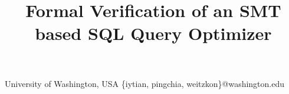 \documentclass[10pt,nonatbib,preprint]{sigplanconf}
\begin{document}
\title{Formal Verification of an SMT based SQL Query Optimizer}

           {University of Washington, USA}
           {\{iytian, pingchia, weitzkon\}@washington.edu\vspace{-1em}}
\maketitle





% 
% 
% 
% 
% 
% 
% 
% 
% 
% 
% 

\printbibliography
\end{document}
